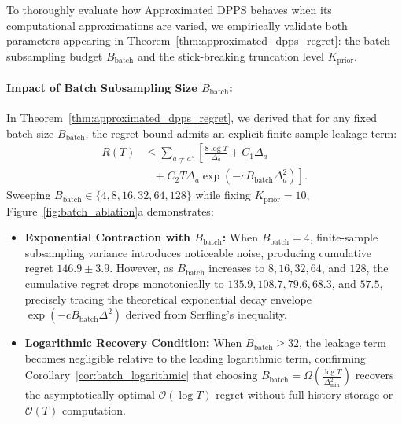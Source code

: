 \documentclass[twoside]{article}
\begin{document}
To thoroughly evaluate how Approximated DPPS behaves when its computational approximations are varied, we empirically validate both parameters appearing in Theorem~\ref{thm:approximated_dpps_regret}: the batch subsampling budget $B_{\text{batch}}$ and the stick-breaking truncation level $K_{\text{prior}}$.

\paragraph{Impact of Batch Subsampling Size $B_{\text{batch}}$:} In Theorem~\ref{thm:approximated_dpps_regret}, we derived that for any fixed batch size $B_{\text{batch}}$, the regret bound admits an explicit finite-sample leakage term:
\begin{equation}
\begin{aligned}
R(T) &\le \sum_{a \ne a^\star} \left[ \frac{8 \log T}{\Delta_a} + C_1 \Delta_a \right. \\
&\quad \left. + \; C_2 T \Delta_a \exp\left( - c B_{\text{batch}} \Delta_a^2 \right) \right].
\end{aligned}
\end{equation}
Sweeping $B_{\text{batch}} \in \{4, 8, 16, 32, 64, 128\}$ while fixing $K_{\text{prior}} = 10$, Figure~\ref{fig:batch_ablation}a demonstrates:
\begin{itemize}
    \item \textbf{Exponential Contraction with $B_{\text{batch}}$:} When $B_{\text{batch}} = 4$, finite-sample subsampling variance introduces noticeable noise, producing cumulative regret $146.9 \pm 3.9$. However, as $B_{\text{batch}}$ increases to $8, 16, 32, 64$, and $128$, the cumulative regret drops monotonically to $135.9, 108.7, 79.6, 68.3$, and $57.5$, precisely tracing the theoretical exponential decay envelope $\exp(-c B_{\text{batch}} \Delta^2)$ derived from Serfling's inequality.
    \item \textbf{Logarithmic Recovery Condition:} When $B_{\text{batch}} \ge 32$, the leakage term becomes negligible relative to the leading logarithmic term, confirming Corollary~\ref{cor:batch_logarithmic} that choosing $B_{\text{batch}} = \Omega\left( \frac{\log T}{\Delta_{\min}^2} \right)$ recovers the asymptotically optimal $\mathcal{O}(\log T)$ regret without full-history storage or $\mathcal{O}(T)$ computation.
\end{itemize}
\end{document}
